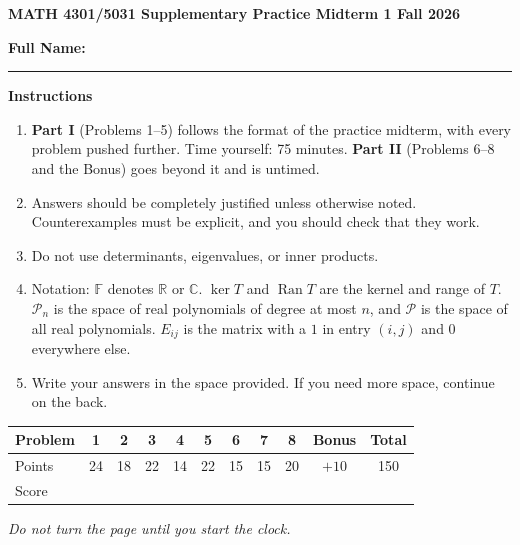 \documentclass[11pt,addpoints]{exam}
\newcommand{\F}{\mathbb{F}}
\newcommand{\R}{\mathbb{R}}
\newcommand{\C}{\mathbb{C}}
\newcommand{\PP}{\mathcal{P}}
\DeclareMathOperator{\Ran}{Ran}
\begin{document}
\noindent\textbf{\large MATH 4301/5031 \hfill Supplementary Practice Midterm 1 \hfill Fall 2026}

\vspace{1.5cm}
\noindent\textbf{Full Name:} \rule{4.3in}{0.4pt}

\vspace{1.2cm}
\noindent\textbf{\large Instructions}
\begin{enumerate}
  \item \textbf{Part I} (Problems 1--5) follows the format of the practice midterm, with every problem pushed further. Time yourself: 75 minutes. \textbf{Part II} (Problems 6--8 and the Bonus) goes beyond it and is untimed.
  \item Answers should be completely justified unless otherwise noted. Counterexamples must be explicit, and you should check that they work.
  \item Do not use determinants, eigenvalues, or inner products.
  \item Notation: $\F$ denotes $\R$ or $\C$. $\ker T$ and $\Ran T$ are the kernel and range of $T$. $\PP_n$ is the space of real polynomials of degree at most $n$, and $\PP$ is the space of all real polynomials. $E_{ij}$ is the matrix with a $1$ in entry $(i,j)$ and $0$ everywhere else.
  \item Write your answers in the space provided. If you need more space, continue on the back.
\end{enumerate}

\vfill
\begin{center}
\renewcommand{\arraystretch}{1.8}
\begin{tabular}{|l|c|c|c|c|c||c|c|c||c||c|}
\hline
Problem & 1 & 2 & 3 & 4 & 5 & 6 & 7 & 8 & Bonus & Total \\ \hline
Points  & 24 & 18 & 22 & 14 & 22 & 15 & 15 & 20 & $+10$ & 150 \\ \hline
Score   &    &    &    &    &    &    &    &    &       &     \\ \hline
\end{tabular}
\end{center}
\vfill
\begin{center}
\textit{Do not turn the page until you start the clock.}
\end{center}
\newpage
\end{document}
